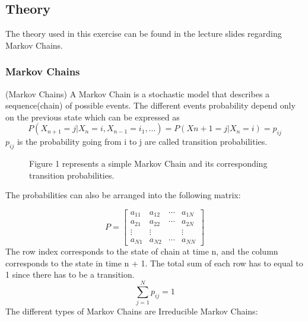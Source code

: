 \newpage
\subsection{Theory}
\label{sec:theory1}

The theory used in this exercise can be found in the lecture slides regarding Markov Chains.

\subsubsection{Markov Chains}
\label{sec:markov1}

\begin{definition}{(Markov Chains)}
    A Markov Chain is a stochastic model that describes a sequence(chain) of possible events. The different events probability depend only on the previous state which can be expressed as
\begin{equation}
    P(X_{n+1} = j|X_n = i,X_{n-1} = i_1,...) = P(X{n+1} = j|X_n = i) = p_{ij}
\end{equation}
$p_{ij}$ is the probability going from i to j are called transition probabilities.
\end{definition}

\begin{figure}[H]
    \centering
    \triangles{}
    \caption{Figure 1 represents a simple Markov Chain and its corresponding transition probabilities.}
\end{figure}


The probabilities can also be arranged into the following matrix:

\begin{equation*}
P = 
\begin{bmatrix}
a_{11} & a_{12} & \cdots & a_{1N} \\
a_{21} & a_{22} & \cdots & a_{2N} \\
\vdots  & \vdots  &  & \vdots  \\
a_{N1} & a_{N2} & \cdots & a_{NN} 
\end{bmatrix}
\end{equation*}
The row index corresponds to the state of chain at time n, and
the column corresponds to the state in time n + 1. The total sum of each row has to equal to 1 since there has to be a transition.
\begin{equation}
    \sum_{j=1}^{N} p_{ij} = 1
\end{equation}
The different types of Markov Chains are Irreducible Markov Chains:

